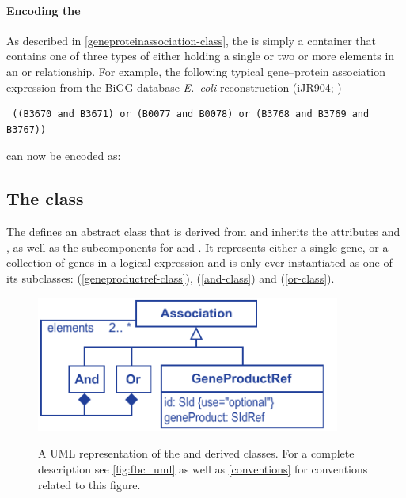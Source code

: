 \paragraph{Encoding the \GeneProteinAssociation}
As described in \ref{geneproteinassociation-class}, the \GeneProteinAssociation
is simply a container that contains one of three types of \Association either
holding a single \GeneProductRef or two or more \Association elements in an
\GeneAnd or \GeneOr relationship. For example, the following typical
gene--protein association expression from the BiGG database \emph{E.~coli}
reconstruction (iJR904; \citealt{ijr904, bigg})
%
\begin{verbatim}
 ((B3670 and B3671) or (B0077 and B0078) or (B3768 and B3769 and B3767))
\end{verbatim}
%
can now be encoded as:
%
\pagebreak
\subsection{The \FBC {} class}
\label{association-class}

The \FBCPackage defines an abstract \Association class that is
derived from \SBase and inherits the attributes  and
, as well as the subcomponents for \Annotation and \Notes.
It represents either a single gene, or a collection of genes in a
logical expression and is only ever instantiated as one of its
subclasses: \GeneProductRef (\ref{geneproductref-class}), \GeneAnd
(\ref{and-class}) and \GeneOr (\ref{or-class}).
%
\begin{figure}[ht!]
  \centering
  \includegraphics[width=10cm]{images/v2harmony_fbc_association.pdf}\\
  \caption{A UML representation of the \FBCPackage \Association and derived
	classes. For a complete description see \ref{fig:fbc_uml} as well as \ref{conventions} for conventions related to this figure.}
  \label{fig:fbc_uml_ass}
\end{figure}

